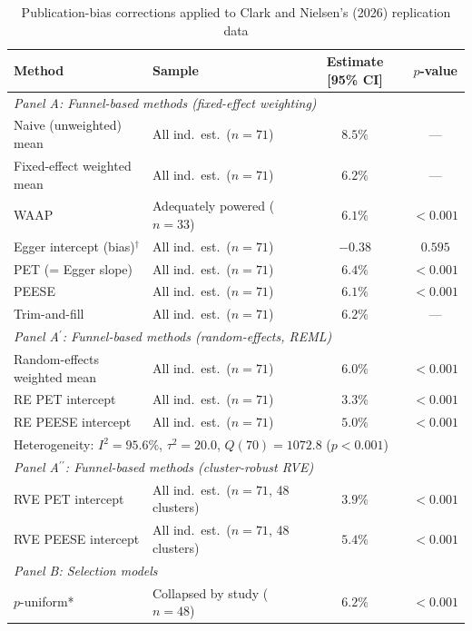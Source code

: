 \begin{table}[htbp]
\centering
\caption{Publication-bias corrections applied to Clark and Nielsen's (2026) replication data}
\label{tab:summary}
\footnotesize
\begin{tabular}{llcc}
\toprule
Method & Sample & Estimate [95\% CI] & $p$-value \\
\midrule
\multicolumn{4}{l}{\textit{Panel A: Funnel-based methods (fixed-effect weighting)}} \\
  Naive (unweighted) mean      & All ind.\ est.\ ($n=71$) & $8.5\%$ & --- \\
  Fixed-effect weighted mean   & All ind.\ est.\ ($n=71$) & $6.2\%$ & --- \\
  WAAP                         & Adequately powered ($n=33$) & $6.1\%$ & $<0.001$ \\
  Egger intercept (bias)$^{\dag}$ & All ind.\ est.\ ($n=71$) & $-0.38$ & $0.595$ \\
  PET (= Egger slope)          & All ind.\ est.\ ($n=71$) & $6.4\%$ & $<0.001$ \\
  PEESE                        & All ind.\ est.\ ($n=71$) & $6.1\%$ & $<0.001$ \\
  Trim-and-fill                & All ind.\ est.\ ($n=71$) & $6.2\%$ & --- \\
\midrule
\multicolumn{4}{l}{\textit{Panel A$^\prime$: Funnel-based methods (random-effects, REML)}} \\
  Random-effects weighted mean & All ind.\ est.\ ($n=71$) & $6.0\%$ & $<0.001$ \\
  RE PET intercept             & All ind.\ est.\ ($n=71$) & $3.3\%$ & $<0.001$ \\
  RE PEESE intercept           & All ind.\ est.\ ($n=71$) & $5.0\%$ & $<0.001$ \\
  \multicolumn{4}{l}{\quad Heterogeneity: $I^2 = 95.6\%$, $\tau^2 = 20.0$, $Q(70) = 1072.8$ ($p<0.001$)} \\[4pt]
\multicolumn{4}{l}{\textit{Panel A$^{\prime\prime}$: Funnel-based methods (cluster-robust RVE)}} \\
  RVE PET intercept            & All ind.\ est.\ ($n=71$, 48 clusters) & $3.9\%$ & $<0.001$ \\
  RVE PEESE intercept          & All ind.\ est.\ ($n=71$, 48 clusters) & $5.4\%$ & $<0.001$ \\
\midrule
\multicolumn{4}{l}{\textit{Panel B: Selection models}} \\
  $p$-uniform*                 & Collapsed by study ($n=48$) & $6.2\%$ & $<0.001$ \\

\end{tabular}
\end{table}
